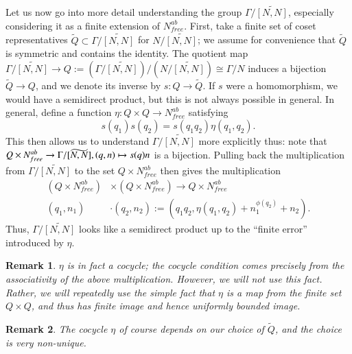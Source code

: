 \documentclass[12pt,reqno]{article}
\numberwithin{equation}{section}
\newtheorem{rmk}{Remark}
\begin{document}
Let us now go into more detail understanding the group $\Gamma/\widetilde{[N,N]}$, especially considering it as a finite extension of $N^{ab}_{free}$.
First, take a finite set of coset representatives $\tilde{Q} \subset \Gamma/\widetilde{[N,N]}$ for $N/\widetilde{[N,N]}$; 
we assume for convenience that
$\tilde{Q}$ is symmetric and contains the identity. 
The quotient map $\Gamma/\widetilde{[N,N]} \to Q := (\Gamma/\widetilde{[N,N]})/(N/\widetilde{[N,N]}) 
\cong \Gamma/N$ induces a bijection $\tilde{Q} \to Q$, and we denote its inverse by $s: Q \to \tilde{Q}$. 
If $s$ were a homomorphism, we would have a semidirect
product, but this is not always possible in general. In general, define a function $\eta : Q \times Q \to N^{ab}_{free}$ satisfying
\[ s(q_1) s(q_2) = s(q_1 q_2) \eta(q_1, q_2). \]
This then allows us to understand $\Gamma/\widetilde{[N,N]}$ more explicitly thus: note that 
$Q \times N^{ab}_{free} \to \Gamma/\widetilde{[N,N]}, \\ {(q,n) \mapsto s(q)n}$
is a bijection. Pulling back the multiplication from $\Gamma/\widetilde{[N,N]}$ to the set $Q \times N^{ab}_{free}$ then gives the multiplication
\begin{align*}
(Q \times N^{ab}_{free}) &\times (Q \times N^{ab}_{free}) \to Q \times N^{ab}_{free} \\
(q_1, n_1) &\cdot (q_2, n_2) := (q_1 q_2, \eta(q_1, q_2) + n_1^{\phi(q_2)} + n_2).
\end{align*}
Thus, $\Gamma/\widetilde{[N,N]}$ looks like a semidirect product up to the ``finite error'' introduced by $\eta$.
\begin{rmk}
$\eta$ is in fact a cocycle; the cocycle condition comes precisely from the associativity of the above multiplication. However, we will
not use this fact. Rather, we will repeatedly use the simple fact that $\eta$ is a map from the finite set $Q \times Q$, and thus
has finite image and hence uniformly bounded image.
\end{rmk}
\begin{rmk}
The cocycle $\eta$ of course depends on our choice of $\tilde{Q}$, and the choice is very non-unique.
\end{rmk}
\end{document}
